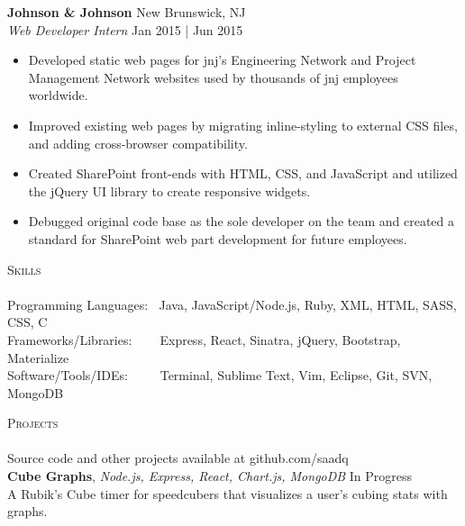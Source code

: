 \documentclass{article}
\newcommand{\lineunder} {
  \vspace*{-8pt} \\
  \hspace*{-18pt} \hrulefill \\
}
\newcommand{\header} [1] {
  {\hspace*{-18pt}\vspace*{6pt} \textsc{#1}} 
  \vspace*{-6pt} \lineunder
}
\begin{document}
            {\textbf{Johnson \& Johnson} \hfill New Brunswick, NJ \\
            \textit{Web Developer Intern} \hfill Jan 2015 | Jun 2015
            \vspace{-1mm}
            \begin{itemize} \itemsep 1pt
                \item Developed static web pages for jnj's Engineering Network and Project Management Network websites used by thousands of jnj employees worldwide.
                \item Improved existing web pages by migrating inline-styling to external CSS files, and adding cross-browser compatibility.
                \item Created SharePoint front-ends with HTML, CSS, and JavaScript and utilized the jQuery UI library to create responsive widgets.
                \item Debugged original code base as the sole developer on the team and created a standard for SharePoint web part development for future employees.
            \end{itemize}



\header{Skills}


            {Programming Languages:} $\:$ Java, JavaScript/Node.js, Ruby, XML, HTML, SASS, CSS, C \vspace{1mm}
            {\\Frameworks/Libraries:} $\:$ $\:$ $\:$ $\:$Express, React, Sinatra, jQuery, Bootstrap, Materialize\vspace{1mm}
            {\\Software/Tools/IDEs:} $\:$ $\:$ $\:$ $\:$ Terminal, Sublime Text, Vim, Eclipse, Git, SVN, MongoDB

  
  
  \vspace{4mm}



\header{Projects}
      Source code and other projects available at github.com/saadq \\
      \vspace{2mm}
      {\textbf{Cube Graphs}, \sl Node.js, Express, React, Chart.js, MongoDB}  \hfill In Progress  \\ 
                A Rubik's Cube timer for speedcubers that visualizes a user's cubing stats with graphs.  \\

}
\end{document}
